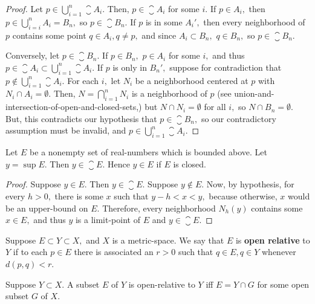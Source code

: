 \documentclass{article}
\begin{document}
\begin{proof}
Let $p \in \bigcup_{i=1}^n \closure{A_i}.$ Then, $p \in \closure{A_i}$ for some $i.$ If $p \in A_i,$ then $p \in \bigcup_{i=i}^n A_i = B_n,$ so $p \in \closure{B_n}.$ If $p$ is in some $A_{i}',$ then every \@{neighborhood} of $p$ contains some point $q \in A_i, q \neq p,$ and since $A_i \subset B_n,$ $q \in B_n,$ so $p \in \closure{B_n}.$

Conversely, let $p \in \closure{B_n}.$ If $p \in B_n,$ $p \in A_i$ for some $i,$ and thus $p \in \closure{A_i} \subset \bigcup_{i=1}^n \closure{A_i}.$ If $p$ is only in $B_{n}',$ suppose for contradiction that $p \notin \bigcup_{i=1}^n \closure{A_i}.$ For each $i,$ let $N_i$ be a neighborhood centered at $p$ with $N_i \cap A_i = \emptyset.$ Then, $N = \bigcap_{i=1}^n N_i$ is a neighborhood of $p$ (see \@{union-and-intersection-of-open-and-closed-sets},) but $N \cap N_i = \emptyset$ for all $i,$ so $N \cap B_n = \emptyset.$ But, this contradicts our hypothesis that $p \in \closure{B_n},$ so our contradictory assumption must be invalid, and $p \in \bigcup_{i=1}^n \closure{A_i}.$
\end{proof}

\begin{theorem}\label{sup-is-in-closure-of-bounded-nonempty-set-of-reals}
Let $E$ be a nonempty set of \@{real-numbers} which is bounded above. Let $y = \sup{E}.$ Then $y \in \closure{E}.$ Hence $y \in E$ if $E$ is \@{closed}.
\end{theorem}

\begin{proof}
Suppose $y \in E.$ Then $y \in \closure{E}.$ Suppose $y \notin E.$ Now, by hypothesis, for every $h > 0,$ there is some $x$ such that $y - h < x < y,$ because otherwise, $x$ would be an \@{upper-bound} on $E.$ Therefore, every \@{neighborhood} $N_h(y)$ contains some $x \in E,$ and thus $y$ is a \@{limit-point} of $E$ and $y \in \closure{E}.$
\end{proof}

\begin{definition}
Suppose $E \subset Y \subset X,$ and $X$ is a \@{metric-space}. We say that $E$ is \textbf{open relative} to $Y$ if to each $p \in E$ there is associated an $r > 0$ such that $q \in E, q \in Y$ whenever $d(p, q) < r.$
\end{definition}

\begin{theorem}\label{open-relative-iff-intersection-with-open-subset}
Suppose $Y \subset X.$ A subset $E$ of $Y$ is \@{open-relative} to $Y$ iff $E = Y \cap G$ for some open subset $G$ of $X.$
\end{theorem}
\end{document}
